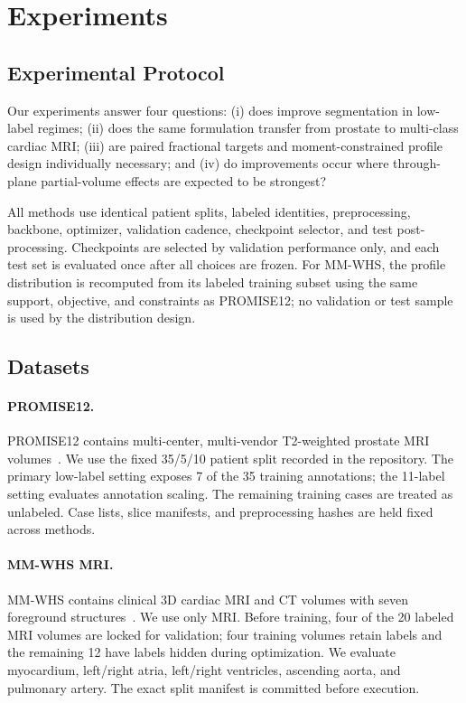 \section{Experiments}

\subsection{Experimental Protocol}
Our experiments answer four questions: (i) does \method{} improve segmentation in low-label regimes; (ii) does the same formulation transfer from prostate to multi-class cardiac MRI; (iii) are paired fractional targets and moment-constrained profile design individually necessary; and (iv) do improvements occur where through-plane partial-volume effects are expected to be strongest?

All methods use identical patient splits, labeled identities, preprocessing, backbone, optimizer, validation cadence, checkpoint selector, and test post-processing. Checkpoints are selected by validation performance only, and each test set is evaluated once after all choices are frozen. For MM-WHS, the profile distribution is recomputed from its labeled training subset using the same support, objective, and constraints as PROMISE12; no validation or test sample is used by the distribution design.

\subsection{Datasets}
\paragraph{PROMISE12.}
PROMISE12 contains multi-center, multi-vendor T2-weighted prostate MRI volumes~\cite{litjens2014promise12}. We use the fixed 35/5/10 patient split recorded in the repository. The primary low-label setting exposes 7 of the 35 training annotations; the 11-label setting evaluates annotation scaling. The remaining training cases are treated as unlabeled. Case lists, slice manifests, and preprocessing hashes are held fixed across methods.

\paragraph{MM-WHS MRI.}
MM-WHS contains clinical 3D cardiac MRI and CT volumes with seven foreground structures~\cite{zhuang2019mmwhs}. We use only MRI. Before training, four of the 20 labeled MRI volumes are locked for validation; four training volumes retain labels and the remaining 12 have labels hidden during optimization. We evaluate myocardium, left/right atria, left/right ventricles, ascending aorta, and pulmonary artery. The exact split manifest is committed before execution.

